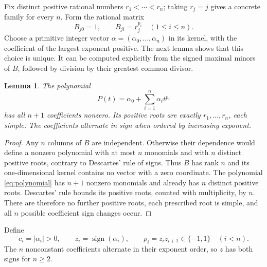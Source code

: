 \documentclass[11pt]{amsart}
\newtheorem{lemma}{Lemma}
\begin{document}
Fix distinct positive rational numbers $r_1<\cdots<r_n$; taking $r_j=j$
gives a concrete family for every $n$. Form the rational matrix
\begin{equation}\label{eq:interpolation}
 B_{j0}=1,\qquad B_{ji}=r_j^{p_i}\quad(1\le i\le n).
\end{equation}
Choose a primitive integer vector $\alpha=(\alpha_0,\ldots,\alpha_n)$
in its kernel, with the coefficient of the largest exponent positive.
The next lemma shows that this choice is unique. It can be computed
explicitly from the signed maximal minors of $B$, followed by division
by their greatest common divisor.

\begin{lemma}\label{lem:interpolation}
The polynomial
\begin{equation}\label{eq:polynomial}
 P(t)=\alpha_0+\sum_{i=1}^n\alpha_i t^{p_i}
\end{equation}
has all $n+1$ coefficients nonzero. Its positive roots are exactly
$r_1,\ldots,r_n$, each simple. The coefficients alternate in sign when
ordered by increasing exponent.
\end{lemma}
\begin{proof}
Any $n$ columns of $B$ are independent. Otherwise their dependence
would define a nonzero polynomial with at most $n$ monomials and with
$n$ distinct positive roots, contrary to Descartes' rule of signs.
Thus $B$ has rank $n$ and its one-dimensional kernel contains no vector
with a zero coordinate. The polynomial \eqref{eq:polynomial} has
$n+1$ nonzero monomials and already has $n$ distinct positive roots.
Descartes' rule bounds its positive roots, counted with multiplicity,
by $n$. There are therefore no further positive roots, each prescribed
root is simple, and all $n$ possible coefficient sign changes occur.
\end{proof}

Define
\begin{equation}\label{eq:signs}
 c_i=|\alpha_i|>0,\qquad z_i=\operatorname{sign}(\alpha_i),
 \qquad \rho_i=z_i z_{i+1}\in\{-1,1\}\quad(i<n).
\end{equation}
The $n$ nonconstant coefficients alternate in their exponent order,
so $z$ has both signs for $n\ge2$.
\end{document}
